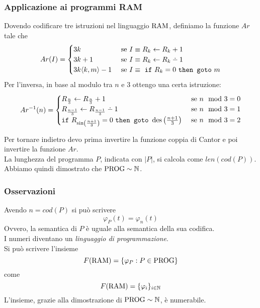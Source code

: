 \subsubsection{Applicazione ai programmi RAM}
Dovendo codificare tre istruzioni nel linguaggio $\text{RAM}$, definiamo la funzione $Ar$ tale che
$$ 
Ar(I) = \begin{cases}
	3k & \text{ se } I \equiv R_k \leftarrow R_k + 1 \\
	3k + 1 & \text{ se } I \equiv R_k \leftarrow R_k \dotminus 1 \\
	3k \langle k,m\rangle - 1 & \text{ se } I \equiv \text{ \texttt{if} } R_k = 0 \text{ \texttt{then goto} } m \\
\end{cases}
$$
Per l'inversa, in base al modulo tra $n$ e 3 ottengo una certa istruzione: 
$$
Ar^{-1} (n) = \begin{cases}
	R_{\frac{n}{3}} \leftarrow R_{\frac{n}{3}} + 1 & \text{ se } n \mod 3 = 0 \\
	R_{\frac{n-1}{3}} \leftarrow R_{\frac{n-1}{3}} \dotminus 1 & \text{ se } n \mod 3 = 1 \\
	\text{\texttt{if} } R_{\sin\left(\frac{n+1}{3}\right)} = 0 \text{ \texttt{then goto} } \des\left(\frac{n+1}{3}\right) & \text{ se } n \mod 3 = 2 \\
\end{cases}
$$

Per tornare indietro devo prima invertire la funzione coppia di Cantor e poi invertire la funzione $Ar$.\\
La lunghezza del programma $P$, indicata con $|P|$, si calcola come $len(cod(P))$.\\

Abbiamo quindi dimostrato che $\text{PROG} \sim \mathbb{N}$.\\

\subsubsection{Osservazioni}
Avendo $n = cod(P)$ si può scrivere
$$ \varphi_P (t) = \varphi_n (t) $$
Ovvero, la semantica di $P$ è uguale alla semantica della sua codifica. \\

I numeri diventano un \textit{linguaggio di programmazione}.\\

Si può scrivere l'insieme 
$$ F(\text{RAM}) = \{\varphi_P: P \in \text{PROG} \}$$
come 
$$ F(\text{RAM}) = \{\varphi_i\}_{i \in \mathbb{N}} $$
L'insieme, grazie alla dimostrazione di $\text{PROG} \sim \mathbb{N}$, è numerabile.\\

